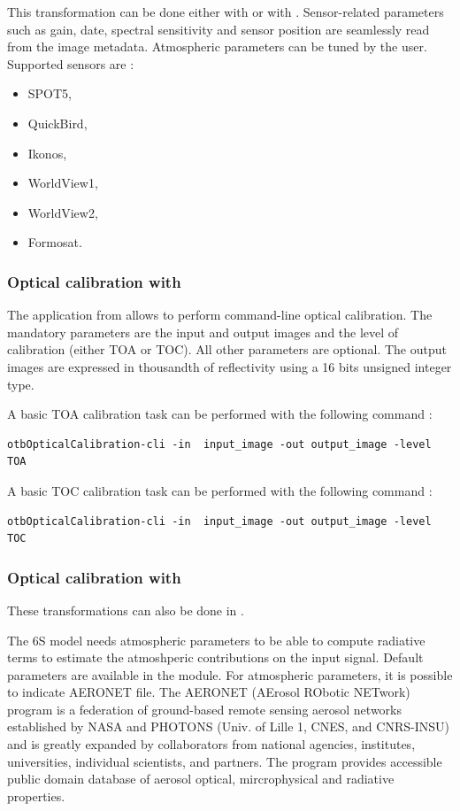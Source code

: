 This transformation can be done either with \app or with
\mont. Sensor-related parameters such as gain, date, spectral
sensitivity and sensor position are seamlessly read from the image
metadata. Atmospheric parameters can be tuned by the user. Supported
sensors are :
\begin{itemize}
\item SPOT5,
\item QuickBird,
\item Ikonos,
\item WorldView1,
\item WorldView2,
\item Formosat.
\end{itemize}

\subsubsection{Optical calibration with \app}

The  application from \app
allows to perform command-line optical calibration. The mandatory
parameters are the input and output images and the level of
calibration (either TOA or TOC). All other parameters are
optional. The output images are expressed in thousandth of
reflectivity using a 16 bits unsigned integer type.

A basic TOA calibration task can be performed with the following command :

\begin{verbatim}
otbOpticalCalibration-cli -in  input_image -out output_image -level TOA
\end{verbatim}

A basic TOC calibration task can be performed with the following command :

\begin{verbatim}
otbOpticalCalibration-cli -in  input_image -out output_image -level TOC
\end{verbatim}

\subsubsection{Optical calibration with \mont}

These transformations can also be done in \mont.

The 6S model needs atmospheric parameters to be able to compute
radiative terms to estimate the atmoshperic contributions on the input
signal. Default parameters are available in the module.  For
atmospheric parameters, it is possible to indicate AERONET file. The
AERONET (AErosol RObotic NETwork) program is a federation of
ground-based remote sensing aerosol networks established by NASA and
PHOTONS (Univ. of Lille 1, CNES, and CNRS-INSU) and is greatly
expanded by collaborators from national agencies, institutes,
universities, individual scientists, and partners. The program
provides accessible public domain database of aerosol optical,
mircrophysical and radiative properties.

